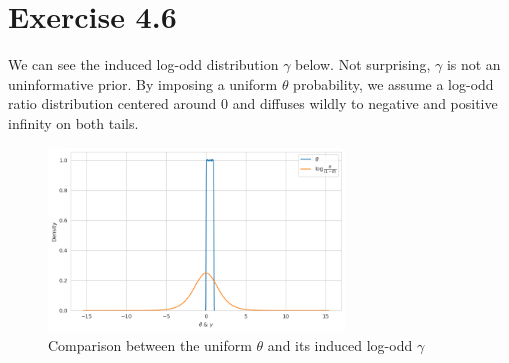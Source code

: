 \documentclass[11pt, letterpaper]{article}
\begin{document}
\section{Exercise 4.6}
We can see the induced log-odd distribution $\gamma$ below. Not surprising, $\gamma$ is not an uninformative prior. By imposing a uniform $\theta$ probability, we assume a log-odd ratio distribution centered around 0 and diffuses wildly to negative and positive infinity on both tails.

\begin{figure}[!h]
  \centering
  \includegraphics[width=0.7\textwidth]{4.6.png}
  \captionsetup{justification=centering}
  \caption{Comparison between the uniform $\theta$ and its induced log-odd $\gamma$}
\end{figure}
\end{document}
